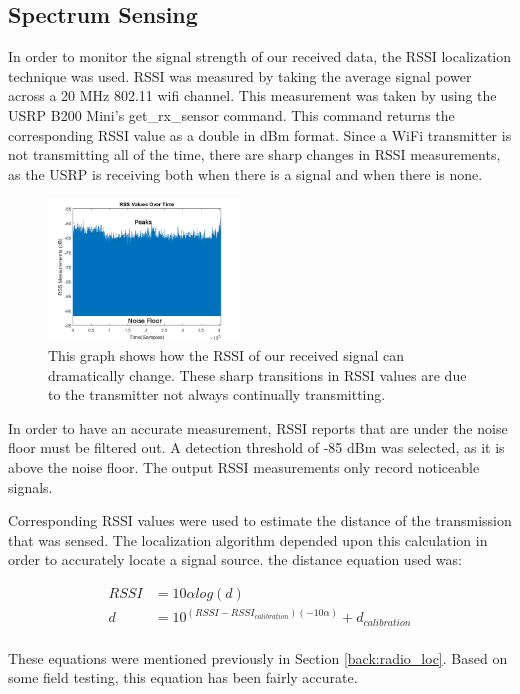 \documentclass[journal,transmag]{IEEEtran}
\begin{document}
\par\subsection{Spectrum Sensing}

In order to monitor the signal strength of our received data, the RSSI localization technique was used. RSSI was measured by taking the average signal power across a 20 MHz 802.11 wifi channel. This measurement was taken by using the USRP B200 Mini’s get\_rx\_sensor command.  This command returns the corresponding RSSI value as a double in dBm format.  Since a WiFi transmitter is not transmitting all of the time, there are sharp changes in RSSI measurements, as the USRP is receiving both when there is a signal and when there is none.

\begin{figure}[h!]
  \centering
  \includegraphics[width=0.45\textwidth]{img/rss_vals_test_labeled.png}
  \caption{This graph shows how the RSSI of our received signal can dramatically change.  These sharp transitions in RSSI values are due to the transmitter not always continually transmitting.}
  \label{fig:rss_values}
\end{figure}
In order to have an accurate measurement, RSSI reports that are under the noise floor must be filtered out. A detection threshold of -85 dBm was selected, as it is above the noise floor.  The output RSSI measurements only record noticeable signals.  

Corresponding RSSI values were used to estimate the distance of the transmission that was sensed.  The localization algorithm depended upon this calculation in order to accurately locate a signal source. the distance equation used was:

 \begin{align}
\label{eq:rss} RSSI &= 10\alpha log(d) \\ 
d &= 10^{(RSSI-RSSI_{calibration})(-10\alpha)} + d_{calibration} \label{eq:rss_dist}
\end{align}\\
These equations were mentioned previously in Section \ref{back:radio_loc}. 
Based on some field testing, this equation has been fairly accurate.\par
\end{document}
